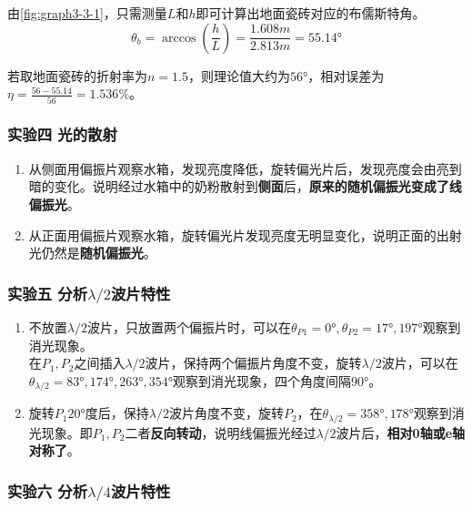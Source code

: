 \documentclass[dvipsnames, svgnames,a4paper,11pt]{article}
\begin{document}
	由\cref{fig:graph3-3-1}，只需测量$L$和$h$即可计算出地面瓷砖对应的布儒斯特角。
	\[
	\theta_b=\arccos(\frac{h}{L})=\frac{1.608m}{2.813m}=\ang{55.14}	
	\]
	
	若取地面瓷砖的折射率为$n=1.5$，则理论值大约为$\ang{56}$，相对误差为$\eta=\frac{56-55.14}{56}=1.536\%$。



	\subsubsection{实验四 \quad 光的散射}

	\begin{enumerate}
		\item 从侧面用偏振片观察水箱，发现亮度降低，旋转偏光片后，发现亮度会由亮到暗的变化。说明经过水箱中的奶粉散射到\textbf{侧面}后，\textbf{原来的随机偏振光变成了线偏振光}。
		\item 从正面用偏振片观察水箱，旋转偏光片发现亮度无明显变化，说明正面的出射光仍然是\textbf{随机偏振光}。
	\end{enumerate}
	
	





	\subsubsection{实验五 \quad 分析$\lambda/2$波片特性}

	\begin{enumerate}
		\item 不放置$\lambda/2$波片，只放置两个偏振片时，可以在$\theta_{P1}=\ang{0},\theta_{P2}=\ang{17},\ang{197}$观察到消光现象。	\\
			在$P_1,P_2$之间插入$\lambda/2$波片，保持两个偏振片角度不变，旋转$\lambda/2$波片，可以在$\theta_{\lambda/2}=\ang{83},\ang{174},\ang{263},\ang{354}$观察到消光现象，四个角度间隔$\ang{90}$。
		\item 旋转$P_1\ang{20}$度后，保持$\lambda/2$波片角度不变，旋转$P_2$，在$\theta_{\lambda/2}=\ang{358},\ang{178}$观察到消光现象。即$P_1,P_2$二者\textbf{反向转动}，说明线偏振光经过$\lambda/2$波片后，\textbf{相对0轴或e轴对称了}。
	\end{enumerate}
	







	\subsubsection{实验六 \quad 分析$\lambda/4$波片特性}
\end{document}
